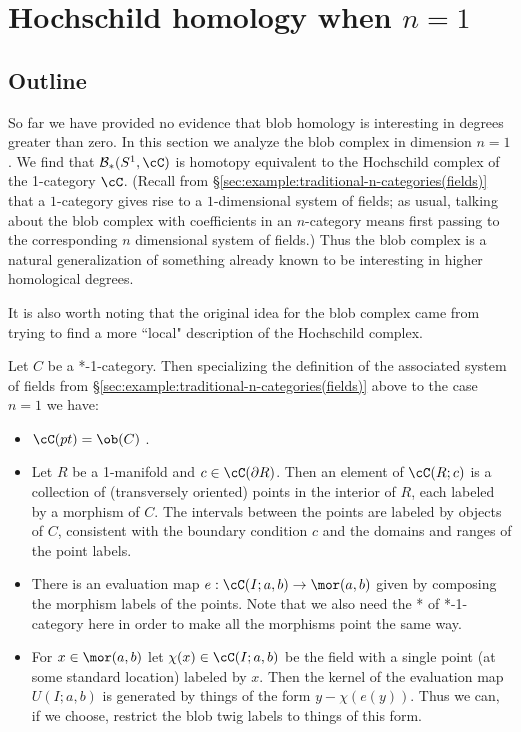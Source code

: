 
\section{Hochschild homology when \texorpdfstring{$n=1$}{n=1}}
\label{sec:hochschild}

\subsection{Outline}

So far we have provided no evidence that blob homology is interesting in degrees 
greater than zero.
In this section we analyze the blob complex in dimension $n=1$.
We find that $\bc_*(S^1, \cC)$ is homotopy equivalent to the 
Hochschild complex of the 1-category $\cC$.
(Recall from \S \ref{sec:example:traditional-n-categories(fields)} that a 
$1$-category gives rise to a $1$-dimensional system of fields; as usual, 
talking about the blob complex with coefficients in an $n$-category means 
first passing to the corresponding $n$ dimensional system of fields.)
Thus the blob complex is a natural generalization of something already
known to be interesting in higher homological degrees.

It is also worth noting that the original idea for the blob complex came from trying
to find a more ``local" description of the Hochschild complex.

Let $C$ be a *-1-category.
Then specializing the definition of the associated system of fields from \S \ref{sec:example:traditional-n-categories(fields)} above to the case $n=1$ we have:
\begin{itemize}
\item $\cC(pt) = \ob(C)$ .
\item Let $R$ be a 1-manifold and $c \in \cC(\bd R)$.
Then an element of $\cC(R; c)$ is a collection of (transversely oriented)
points in the interior
of $R$, each labeled by a morphism of $C$.
The intervals between the points are labeled by objects of $C$, consistent with
the boundary condition $c$ and the domains and ranges of the point labels.
\item There is an evaluation map $e: \cC(I; a, b) \to \mor(a, b)$ given by
composing the morphism labels of the points.
Note that we also need the * of *-1-category here in order to make all the morphisms point
the same way.
\item For $x \in \mor(a, b)$ let $\chi(x) \in \cC(I; a, b)$ be the field with a single
point (at some standard location) labeled by $x$.
Then the kernel of the evaluation map $U(I; a, b)$ is generated by things of the
form $y - \chi(e(y))$.
Thus we can, if we choose, restrict the blob twig labels to things of this form.
\end{itemize}

